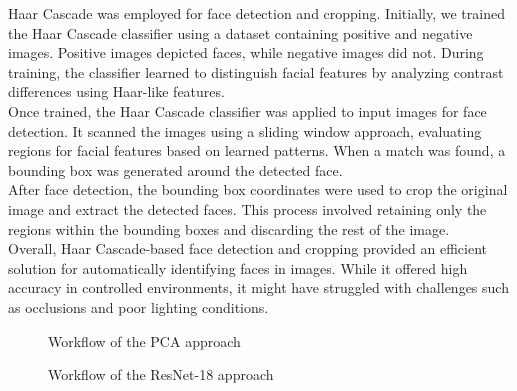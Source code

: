 \documentclass{article}
\begin{document}
    Haar Cascade was employed for face detection and cropping. Initially, we trained the Haar Cascade classifier using a dataset containing positive and negative images. Positive images depicted faces, while negative images did not. During training, the classifier learned to distinguish facial features by analyzing contrast differences using Haar-like features.
\\
    Once trained, the Haar Cascade classifier was applied to input images for face detection. It scanned the images using a sliding window approach, evaluating regions for facial features based on learned patterns. When a match was found, a bounding box was generated around the detected face.
\\
    After face detection, the bounding box coordinates were used to crop the original image and extract the detected faces. This process involved retaining only the regions within the bounding boxes and discarding the rest of the image.
\\
    Overall, Haar Cascade-based face detection and cropping provided an efficient solution for automatically identifying faces in images. While it offered high accuracy in controlled environments, it might have struggled with challenges such as occlusions and poor lighting conditions.

      \begin{figure}[!hbt]
        \noindent{}
        \caption{Workflow of the PCA approach }
    \end{figure}

    \begin{figure}[!hbt]
        \noindent{}
        \caption{Workflow of the ResNet-18 approach }
    \end{figure}
    
\end{document}

